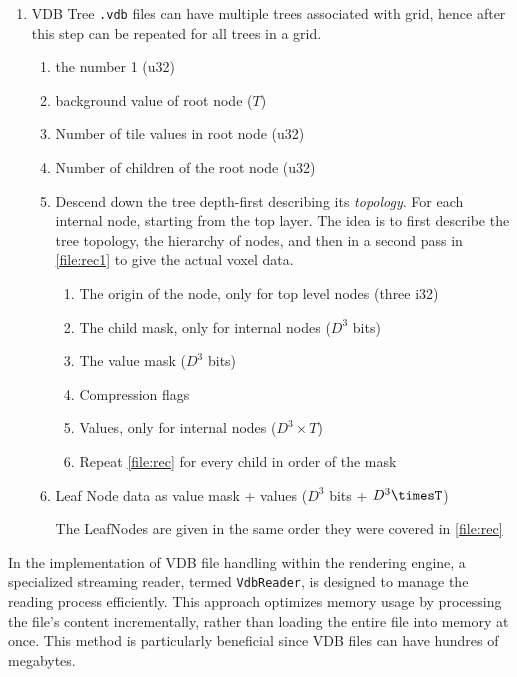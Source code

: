\begin{enumerate}
\begin{enumerate}
        \end{enumerate}
  \item VDB Tree
        \verb|.vdb| files can have multiple trees associated with grid, hence after this step can be repeated for all trees in a grid.
        \begin{enumerate}
          \item the number 1 (u32)
          \item background value of root node ($T$)
          \item Number of tile values in root node (u32)
          \item Number of children of the root node (u32)
          \item Descend down the tree depth-first describing its \emph{topology}.
                For each internal node, starting from the top layer.
                The idea is to first describe the tree topology, the hierarchy of nodes, and then in a second pass in \cref{file:rec1} to give the actual voxel data.
                \begin{enumerate}
                \label{file:rec}
                  \item The origin of the node, only for top level nodes (three i32)
                  \item The child mask, only for internal nodes ($D^3$ bits)
                  \item The value mask ($D^3$ bits)
                  \item Compression flags
                  \item Values, only for internal nodes ($D^{3} \times T$)
                  \item Repeat \cref{file:rec} for every child in order of the mask
                \end{enumerate}
          \item\label{file:rec1} Leaf Node data as value mask + values ($D^{3}$ bits + $D^{3}\timesT$)

                The LeafNodes are given in the same order they were covered in \cref{file:rec}
        \end{enumerate}
\end{enumerate}

In the implementation of VDB file handling within the rendering engine, a specialized streaming reader, termed \texttt{VdbReader}, is designed to manage the reading process efficiently.
This approach optimizes memory usage by processing the file's content incrementally, rather than loading the entire file into memory at once.
This method is particularly beneficial since VDB files can have hundres of megabytes.

